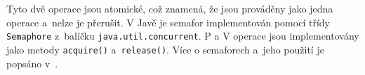 Tyto dvě operace jsou atomické, což znamená, že jsou prováděny jako jedna operace a~nelze je přerušit.
V Javě je semafor implementován pomocí třídy \texttt{Semaphore} z~balíčku \texttt{java.util.concurrent}.
P a V operace jsou implementovány jako metody \texttt{acquire()} a~\texttt{release()}.
Více o semaforech a~jeho použití je popsáno v~\cite{pesicka_mutexy_monitory}. 


